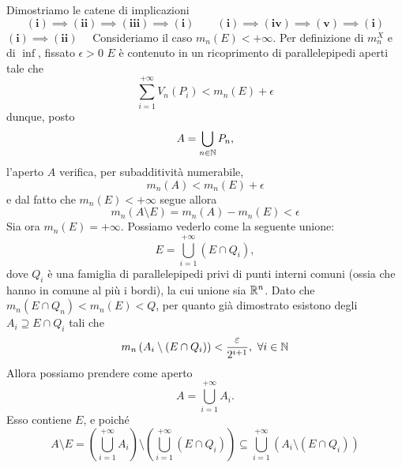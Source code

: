 \begin{demonstration}
	Dimostriamo le catene di implicazioni
	\begin{equation*}
		\mathbf{(i)\implies (ii)\implies (iii)\implies (i)\qquad(i)\implies (iv)\implies (v)\implies (i)}
	\end{equation*}
$\mathbf{(i)\implies(ii)}\quad$ Consideriamo il caso $m_n\left(E\right)<+\infty$. Per definizione di $m^{X}_n$ e di $\inf$, fissato $\epsilon >0$ $E$ è contenuto in un ricoprimento di parallelepipedi aperti tale che
\begin{equation*}
	\sum_{i=1}^{+\infty}V_n\left(P_i\right)<m_n\left(E\right)+\epsilon
\end{equation*}
dunque, posto
\begin{equation*}
	A=\bigcup_{n\in\mathbb{N}}P_n,
\end{equation*}
l'aperto $A$ verifica, per subadditività numerabile,
\begin{equation*}
	m_n\left(A\right)<m_n\left(E\right)+\epsilon
\end{equation*}
e dal fatto che $m_n\left(E\right)<+\infty$ segue allora %
\begin{equation*}
	m_n\left(A\setminus E\right)=m_n\left(A\right)-m_n\left(E\right)<\epsilon
\end{equation*}
Sia ora $m_n\left(E\right)=+\infty$. Possiamo vederlo come la seguente unione:
\begin{equation*}
	E=\bigcup_{i=1}^{+\infty}\left(E\cap Q_i\right),
\end{equation*}
dove $Q_i$ è una famiglia di parallelepipedi privi di punti interni comuni (ossia che hanno in comune al più i bordi), la cui unione sia $\mathbb{R}^n$. Dato che $m_n\left(E\cap Q_n\right)<m_n\left(E\right)<Q$, per quanto già dimostrato esistono degli $A_i\supseteq E\cap Q_i$ tali che
\begin{equation*}
	m_n\left(A_i\setminus\left(E\cap Q_i\right)\right)<\frac{\varepsilon}{2^{i+1}},\ \forall i\in\mathbb{N}
\end{equation*}
Allora possiamo prendere come aperto
\begin{equation*}
	A=\bigcup_{i=1}^{+\infty}A_i.
\end{equation*}
Esso contiene $E$, e poiché
\begin{equation*}
	A\setminus E=\left(\bigcup_{i=1}^{+\infty}A_i\right)\setminus\left(\bigcup_{i=1}^{+\infty}\left(E\cap Q_i\right)\right)\subseteq\bigcup_{i=1}^{+\infty}\left(A_i\setminus\left(E\cap Q_i\right)\right)
\end{equation*}

\end{demonstration}
